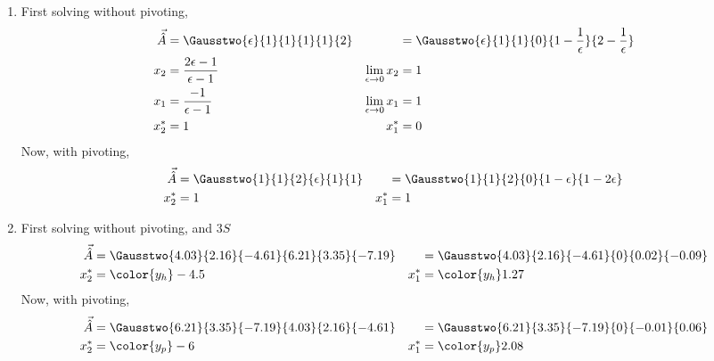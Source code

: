 \begin{enumerate}
\begin{enumerate}
              \item First solving without pivoting,
                    \begin{align}
                        \vec{\hat{A}} & = \Gausstwo{\epsilon}{1}{1}{1}{1}{2} &
                                      & = \Gausstwo{\epsilon}{1}{1}
                        {0}{1 - \frac{1}{\epsilon}}{2 - \frac{1}{\epsilon}}    \\
                        x_2           & = \frac{2\epsilon - 1}{\epsilon - 1} &
                        \lim_{\epsilon \to 0} x_2
                                      & = 1                                    \\
                        x_1           & = \frac{-1}{\epsilon - 1}            &
                        \lim_{\epsilon \to 0} x_1
                                      & = 1                                    \\
                        x_2^*         & = 1                                  &
                        x_1^*         & = 0
                    \end{align}
                    Now, with pivoting,
                    \begin{align}
                        \vec{\hat{A}} & = \Gausstwo{1}{1}{2}{\epsilon}{1}{1} &
                                      & = \Gausstwo{1}{1}{2}
                        {0}{1 - \epsilon}{1 - 2\epsilon}                       \\
                        x_2^*         & = 1                                  &
                        x_1^*         & = 1
                    \end{align}

              \item First solving without pivoting, and $ 3S $
                    \begin{align}
                        \vec{\hat{A}}       & = \Gausstwo{4.03}{2.16}{-4.61}
                        {6.21}{3.35}{-7.19} &
                                            & = \Gausstwo{4.03}{2.16}{-4.61}
                        {0}{0.02}{-0.09}                                       \\
                        x_2^*               & = \color{y_h} -4.5             &
                        x_1^*               & = \color{y_h} 1.27
                    \end{align}
                    Now, with pivoting,
                    \begin{align}
                        \vec{\hat{A}}       & = \Gausstwo{6.21}{3.35}{-7.19}
                        {4.03}{2.16}{-4.61} &
                                            & = \Gausstwo{6.21}{3.35}{-7.19}
                        {0}{-0.01}{0.06}                                       \\
                        x_2^*               & = \color{y_p} -6               &
                        x_1^*               & = \color{y_p} 2.08
                    \end{align}


\end{enumerate}
\end{enumerate}

